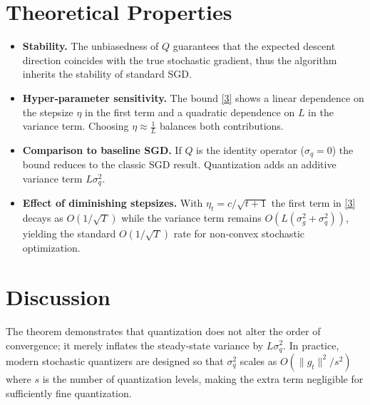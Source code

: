 \documentclass{article}
\begin{document}
\section*{Theoretical Properties}
\begin{itemize}
\item \textbf{Stability.} The unbiasedness of $Q$ guarantees that the expected descent direction coincides with the true stochastic gradient, thus the algorithm inherits the stability of standard SGD.
\item \textbf{Hyper‑parameter sensitivity.} The bound \eqref{3} shows a linear dependence on the stepsize $\eta$ in the first term and a quadratic dependence on $L$ in the variance term. Choosing $\eta\approx \frac{1}{L}$ balances both contributions.
\item \textbf{Comparison to baseline SGD.} If $Q$ is the identity operator ($\sigma_q=0$) the bound reduces to the classic SGD result. Quantization adds an additive variance term $L\sigma_q^2$.
\item \textbf{Effect of diminishing stepsizes.} With $\eta_t=c/\sqrt{t+1}$ the first term in \eqref{3} decays as $O(1/\sqrt{T})$ while the variance term remains $O(L(\sigma_g^2+\sigma_q^2))$, yielding the standard $O(1/\sqrt{T})$ rate for non‑convex stochastic optimization.
\end{itemize}

\section*{Discussion}
The theorem demonstrates that quantization does not alter the order of convergence; it merely inflates the steady‑state variance by $L\sigma_q^2$. In practice, modern stochastic quantizers are designed so that $\sigma_q^2$ scales as $O(\|g_t\|^2 /s^2)$ where $s$ is the number of quantization levels, making the extra term negligible for sufficiently fine quantization.

\newpage
\end{document}

